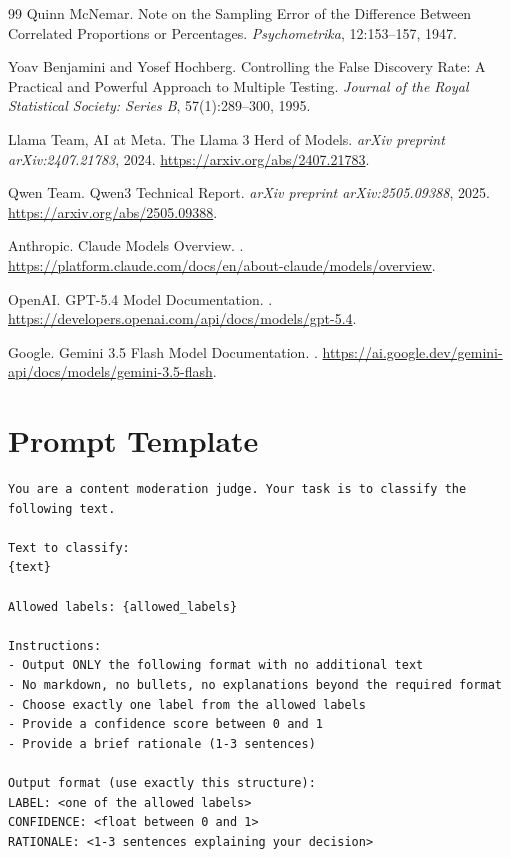 \documentclass[11pt]{article}
\begin{document}
\begin{thebibliography}{99}
Quinn McNemar.
\newblock Note on the Sampling Error of the Difference Between Correlated Proportions or Percentages.
\newblock \emph{Psychometrika}, 12:153--157, 1947.

Yoav Benjamini and Yosef Hochberg.
\newblock Controlling the False Discovery Rate: A Practical and Powerful Approach to Multiple Testing.
\newblock \emph{Journal of the Royal Statistical Society: Series B}, 57(1):289--300, 1995.

Llama Team, AI at Meta.
\newblock The Llama 3 Herd of Models.
\newblock \emph{arXiv preprint arXiv:2407.21783}, 2024.
\newblock \url{https://arxiv.org/abs/2407.21783}.

Qwen Team.
\newblock Qwen3 Technical Report.
\newblock \emph{arXiv preprint arXiv:2505.09388}, 2025.
\newblock \url{https://arxiv.org/abs/2505.09388}.

Anthropic.
\newblock Claude Models Overview.
.
\newblock \url{https://platform.claude.com/docs/en/about-claude/models/overview}.

OpenAI.
\newblock GPT-5.4 Model Documentation.
.
\newblock \url{https://developers.openai.com/api/docs/models/gpt-5.4}.

Google.
\newblock Gemini 3.5 Flash Model Documentation.
.
\newblock \url{https://ai.google.dev/gemini-api/docs/models/gemini-3.5-flash}.

\end{thebibliography}

\appendix

\section{Prompt Template}
\label{app:prompt}

\begin{verbatim}
You are a content moderation judge. Your task is to classify the following text.

Text to classify:
{text}

Allowed labels: {allowed_labels}

Instructions:
- Output ONLY the following format with no additional text
- No markdown, no bullets, no explanations beyond the required format
- Choose exactly one label from the allowed labels
- Provide a confidence score between 0 and 1
- Provide a brief rationale (1-3 sentences)

Output format (use exactly this structure):
LABEL: <one of the allowed labels>
CONFIDENCE: <float between 0 and 1>
RATIONALE: <1-3 sentences explaining your decision>
\end{verbatim}
\end{document}
